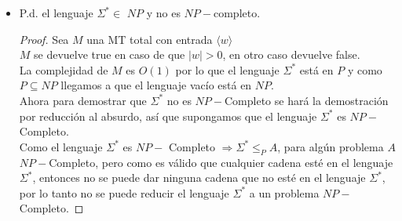 \documentclass[letterpaper,10pt]{article}
\begin{document}
\begin{enumerate}
\begin{itemize}
\begin{proof}
            Como el lenguaje $\varnothing$ es $NP-$ Completo $\Rightarrow  
            \varnothing \leq_P A$, para algún problema $A$ $NP-$Completo, pero
            como no hay ninguna cadena en el lenguaje $\varnothing$, entonces 
            ninguna cadena está en el lenguaje $\varnothing$, por lo tanto no 
            se puede reducir el lenguaje $\varnothing$ a un problema
            $NP-$Completo. 
 				
        \end{proof}
        
        \item P.d. el lenguaje $\Sigma^{*} \in $ $NP$ y no es $NP-$completo.
        
        \begin{proof}
            Sea $M$ una MT total con entrada $\langle w \rangle$\\
				
            $M$ se devuelve true en caso de que $|w|>0$, en otro caso devuelve
            false.\\
				
            La complejidad de $M$ es $O(1)$ por lo que el lenguaje $\Sigma^{*}$
            está en $P$ y como $P \subseteq NP$ llegamos a que el lenguaje
            vacío está en $NP$.\\
				
            Ahora para demostrar que $\Sigma^{*}$ no es $NP-$Completo se hará
            la demostración por reducción al absurdo, así que supongamos que el
            lenguaje $\Sigma^{*}$ es $NP-$Completo.\\
				
            Como el lenguaje $\Sigma^{*}$ es $NP-$ Completo $\Rightarrow
            \Sigma^{*} \leq_P A$, para algún problema $A$ $NP-$Completo, pero
            como es válido que cualquier cadena esté en el lenguaje
            $\Sigma^{*}$, entonces no se puede dar ninguna cadena que no esté
            en el lenguaje $\Sigma^{*}$, por lo tanto no se puede reducir el 
            lenguaje $\Sigma^{*}$ a un problema $NP-$Completo.
				
        \end{proof}
        
		\end{itemize}
    
    \end{enumerate}
\end{document}
